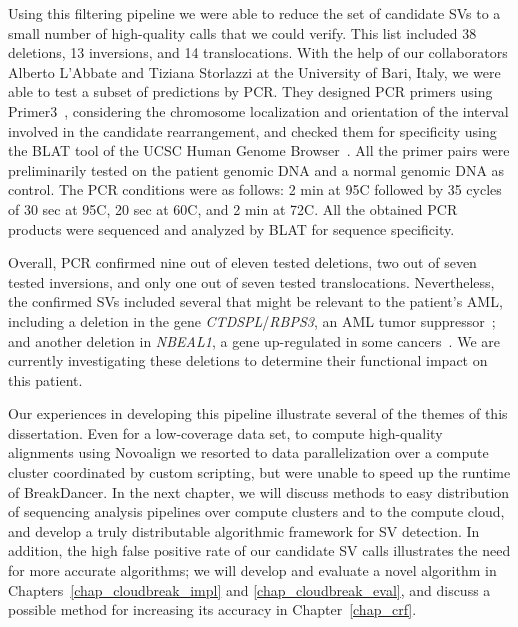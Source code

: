 Using this filtering pipeline we were able to reduce the set of candidate SVs to a small number of high-quality calls that we could verify. This list included 38 deletions, 13 inversions, and 14 translocations. With the help of our collaborators Alberto L'Abbate and Tiziana Storlazzi at the University of Bari, Italy, we were able to test a subset of predictions by PCR. They designed PCR primers using Primer3~\cite{Untergasser01082012}, considering the chromosome localization and orientation of the interval involved in the candidate rearrangement, and checked them for specificity using the BLAT tool of the UCSC Human Genome Browser~\cite{Kent01042002}. All the primer pairs were preliminarily tested on the patient genomic DNA and a normal genomic DNA as control. The PCR conditions were as follows: 2 min at 95\degree C followed by 35 cycles of 30 sec at 95\degree C, 20 sec at 60\degree C, and 2 min at 72\degree C. All the obtained PCR products were sequenced and analyzed by BLAT for sequence specificity. 

Overall, PCR confirmed nine out of eleven tested deletions, two out of seven tested inversions, and only one out of seven tested translocations. Nevertheless, the confirmed SVs included several that might be relevant to the patient's AML, including a deletion in the gene \emph{CTDSPL}/\emph{RBPS3}, an AML tumor suppressor~\cite{Zheng:2012kk}; and another deletion in \emph{NBEAL1}, a gene up-regulated in some cancers~\cite{Chen:2004jo}. We are currently investigating these deletions to determine their functional impact on this patient. 

Our experiences in developing this pipeline illustrate several of the themes of this dissertation. Even for a low-coverage data set, to compute high-quality alignments using Novoalign we resorted to data parallelization over a compute cluster coordinated by custom scripting, but were unable to speed up the runtime of BreakDancer. In the next chapter, we will discuss methods to easy distribution of sequencing analysis pipelines over compute clusters and to the compute cloud, and develop a truly distributable algorithmic framework for SV detection. In addition, the high false positive rate of our candidate SV calls illustrates the need for more accurate algorithms; we will develop and evaluate a novel algorithm in Chapters~\ref{chap_cloudbreak_impl} and \ref{chap_cloudbreak_eval}, and discuss a possible method for increasing its accuracy in Chapter~\ref{chap_crf}.